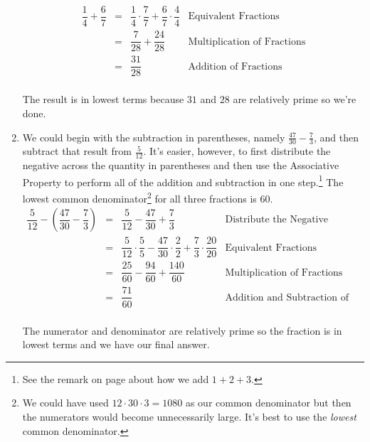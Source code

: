 \documentclass{ximera}
\begin{document}
\begin{example}
\begin{enumerate}
\[\begin{array}{rclr}
\dfrac{1}{4} + \dfrac{6}{7} & = & \dfrac{1}{4} \cdot \dfrac{7}{7} + \dfrac{6}{7} \cdot \dfrac{4}{4} &  \text{Equivalent Fractions} \\ [10pt]
                                           & = & \dfrac{7}{28}  + \dfrac{24}{28} & \text{Multiplication of Fractions}\\ [10pt]
																					 & = & \dfrac{31}{28}                  & \text{Addition of Fractions} \\ \end{array} \]

The result is in lowest terms because $31$ and $28$ are relatively prime so we're done.


\item  We could begin with the subtraction in parentheses, namely $\frac{47}{30} - \frac{7}{3}$, and then subtract that result from $\frac{5}{12}$.  It's easier, however, to first distribute the negative across the quantity in parentheses and then use the Associative Property to perform all of the addition and subtraction in one step.\footnote{See the remark on page \pageref{howtoaddonetwothree} about how we add $1 + 2 + 3$.}  The lowest common denominator\footnote{We could have used $12 \cdot 30 \cdot 3 = 1080$ as our common denominator but then the numerators would become unnecessarily large.  It's best to use the \emph{lowest} common denominator.} for all three fractions is $60$.\[ \begin{array}{rclr}

\dfrac{5}{12} - \left(\dfrac{47}{30} - \dfrac{7}{3}\right) & = & \dfrac{5}{12} - \dfrac{47}{30} + \dfrac{7}{3} & \text{Distribute the Negative}\\ [10pt]
& = & \dfrac{5}{12} \cdot \dfrac{5}{5} - \dfrac{47}{30} \cdot \dfrac{2}{2} + \dfrac{7}{3} \cdot \dfrac{20}{20} & \text{Equivalent Fractions}\\ [10pt]
& = & \dfrac{25}{60} - \dfrac{94}{60} + \dfrac{140}{60} & \text{Multiplication of Fractions} \\ [10pt]
& = & \dfrac{71}{60} & \text{Addition and Subtraction of Fractions} \\ \end{array}\]

The numerator and denominator are relatively prime so the fraction is in lowest terms and we have our final answer.



\end{enumerate}
\end{example}
\end{document}
